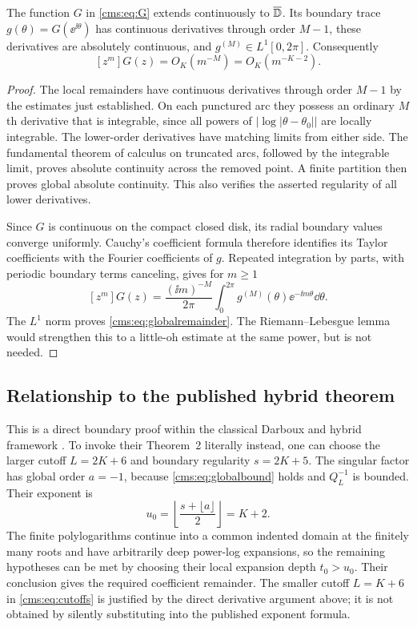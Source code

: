 \begin{lemma}\label{cms:lem:Fourier}
The function $G$ in \eqref{cms:eq:G} extends continuously to $\overline{\mathbb D}$. Its boundary trace $g(\theta)=G(\ee^{\ii\theta})$ has continuous derivatives through order $M-1$, these derivatives are absolutely continuous, and $g^{(M)}\in L^1[0,2\pi]$. Consequently
\begin{equation}\label{cms:eq:globalremainder}
[z^m]G(z)=O_K(m^{-M})=O_K(m^{-K-2}).
\end{equation}
\end{lemma}
\begin{proof}
The local remainders have continuous derivatives through order $M-1$ by the estimates just established. On each punctured arc they possess an ordinary $M$th derivative that is integrable, since all powers of $|\log |\theta-\theta_0||$ are locally integrable. The lower-order derivatives have matching limits from either side. The fundamental theorem of calculus on truncated arcs, followed by the integrable limit, proves absolute continuity across the removed point. A finite partition then proves global absolute continuity. This also verifies the asserted regularity of all lower derivatives.

Since $G$ is continuous on the compact closed disk, its radial boundary values converge uniformly. Cauchy's coefficient formula therefore identifies its Taylor coefficients with the Fourier coefficients of $g$. Repeated integration by parts, with periodic boundary terms canceling, gives for $m\geq1$
\begin{equation}\label{cms:eq:Fourier}
[z^m]G(z)=\frac{(\ii m)^{-M}}{2\pi}
\int_0^{2\pi}g^{(M)}(\theta)\ee^{-\ii m\theta}\dd\theta.
\end{equation}
The $L^1$ norm proves \eqref{cms:eq:globalremainder}. The Riemann--Lebesgue lemma would strengthen this to a little-oh estimate at the same power, but is not needed.
\end{proof}

\subsection{Relationship to the published hybrid theorem}
This is a direct boundary proof within the classical Darboux and hybrid framework \cite{FFGPP}. To invoke their Theorem~2 literally instead, one can choose the larger cutoff $L=2K+6$ and boundary regularity $s=2K+5$. The singular factor has global order $a=-1$, because \eqref{cms:eq:globalbound} holds and $Q_L^{-1}$ is bounded. Their exponent is
\[
u_0=\left\lfloor\frac{s+\lfloor a\rfloor}{2}\right\rfloor=K+2.
\]
The finite polylogarithms continue into a common indented domain at the finitely many roots and have arbitrarily deep power-log expansions, so the remaining hypotheses can be met by choosing their local expansion depth $t_0>u_0$. Their conclusion gives the required coefficient remainder. The smaller cutoff $L=K+6$ in \eqref{cms:eq:cutoffs} is justified by the direct derivative argument above; it is not obtained by silently substituting into the published exponent formula.
